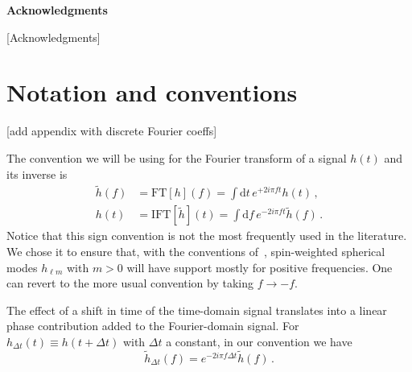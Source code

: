 \documentclass[aps,showpacs,twocolumn,
prd,superscriptaddress,nofootinbib]{revtex4-1}
\newcommand{\be}{\begin{equation}}
\newcommand{\ee}{\end{equation}}
\newcommand\ud{{\mathrm{d}}}
\newcommand{\SM}[1]{{\color{Red} #1}}
\begin{document}

\vspace{4.5mm}

\hspace{0.85in}
{\bf Acknowledgments}

\vspace{3.5mm}

[Acknowledgments]


\appendix

\section{Notation and conventions}
\label{app:notation}

\SM{[add appendix with discrete Fourier coeffs]}

The convention we will be using for the Fourier transform of a signal $h(t)$ and its inverse is
\begin{subequations}
\label{eq:defFT}
\begin{align}
	\tilde{h}(f) &= \mathrm{FT}[h](f) =  \int \ud t \, e^{+2i\pi f t} h(t) \,, \\
	h(t) &= \mathrm{IFT}[\tilde{h}](t) =  \int \ud f \, e^{-2i\pi f t} \tilde{h}(f) \,.
\end{align}
\end{subequations}
Notice that this sign convention is not the most frequently used in the literature. We chose it to ensure that, with the conventions of~\cite{BlanchetLiving}, spin-weighted spherical modes $h_{\ell m}$ with $m>0$ will have support mostly for positive frequencies. One can revert to the more usual convention by taking $f\rightarrow -f$.

The effect of a shift in time of the time-domain signal translates into a linear phase contribution added to the Fourier-domain signal. For $h_{\Delta t}(t) \equiv h(t+\Delta t)$ with $\Delta t$ a constant, in our convention we have
\be\label{eq:shifttime}
	\tilde{h}_{\Delta t} (f) = e^{-2i\pi f \Delta t} \tilde{h}(f) \,.
\ee
\end{document}
